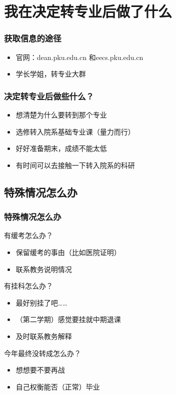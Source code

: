 \documentclass[12pt,AutoFakeBold]{beamer}
\begin{document}
    \section{我在决定转专业后做了什么}
    \begin{frame}
        \frametitle{获取信息的途径}
        \begin{itemize}
            \item 官网：dean.pku.edu.cn 和eecs.pku.edu.cn
            \item 学长学姐，转专业大群
        \end{itemize}
    \end{frame}
    \begin{frame}
        \frametitle{决定转专业后做些什么？}
        \begin{itemize}
            \item 想清楚为什么要转到那个专业
            \item 选修转入院系基础专业课（\alert{量力而行}）
            \item 好好准备期末，成绩不能太低
            \item 有时间可以去接触一下转入院系的科研
        \end{itemize}
    \end{frame}
    \subsection{特殊情况怎么办}
    \begin{frame}
        \frametitle{特殊情况怎么办}
        有缓考怎么办？
        \begin{itemize}
            \item 保留缓考的事由（比如医院证明）
            \item 联系教务说明情况
        \end{itemize}
        有挂科怎么办？
        \begin{itemize}
            \item 最好别挂了吧……
            \item （第二学期）感觉要挂就中期退课
            \item 及时联系教务解释
        \end{itemize}
        今年最终没转成怎么办？
        \begin{itemize}
            \item 想想要不要再战
            \item 自己权衡能否（正常）毕业
        \end{itemize}
    \end{frame}
\end{document}
